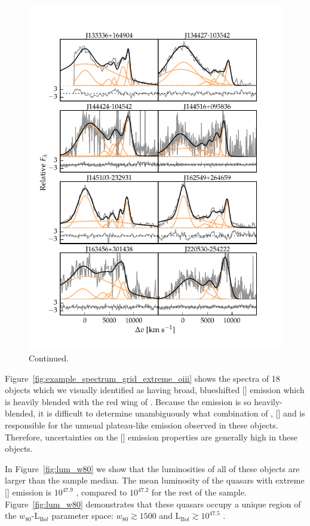 \begin{figure}
\ContinuedFloat
    \centering
    \includegraphics[width=\columnwidth]{figures/chapter04/example_spectrum_grid_extreme_oiii_2.pdf} 
    \caption{Continued.}     
\end{figure}

Figure~\ref{fig:example_spectrum_grid_extreme_oiii} shows the spectra of 18 objects which we visually identified as having broad, blueshifted [] emission which is heavily blended with the red wing of \hbns. 
Because the emission is so heavily-blended, it is difficult to determine unambiguously what combination of \hb, [] and  is responsible for the unusual plateau-like emission observed in these objects. 
Therefore, uncertainties on the [] emission properties are generally high in these objects. 

In Figure~\ref{fig:lum_w80} we show that the luminosities of all of these objects are larger than the sample median.
The mean luminosity of the quasars with extreme [] emission is $10^{47.9}$ \ergs, compared to $10^{47.2}$ \ergs for the rest of the sample. 
Figure~\ref{fig:lum_w80} demonstrates that these quasars occupy a unique region of the $w_{80}$-L$_{\mathrm Bol}$ parameter space: $w_{80}\gtrsim1500$ \kms and L$_{\mathrm Bol}\gtrsim10^{47.5}$ \ergs. 

